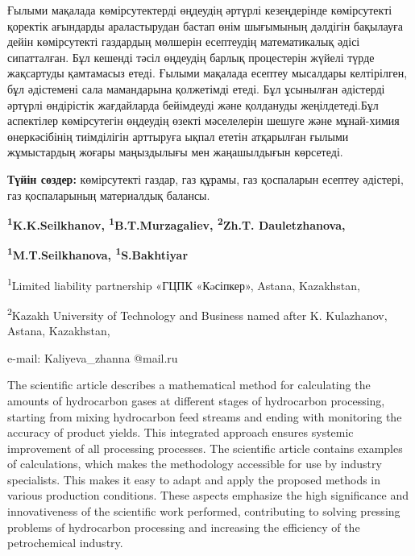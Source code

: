 Ғылыми мақалада көмірсутектерді өңдеудің әртүрлі кезеңдерінде
көмірсутекті қоректік ағындарды араластырудан бастап өнім шығымының
дәлдігін бақылауға дейін көмірсутекті газдардың мөлшерін есептеудің
математикалық әдісі сипатталған. Бұл кешенді тәсіл өңдеудің барлық
процестерін жүйелі түрде жақсартуды қамтамасыз етеді. Ғылыми мақалада
есептеу мысалдары келтірілген, бұл әдістемені сала мамандарына
қолжетімді етеді. Бұл ұсынылған әдістерді әртүрлі өндірістік жағдайларда
бейімдеуді және қолдануды жеңілдетеді.Бұл аспектілер көмірсутегін
өңдеудің өзекті мәселелерін шешуге және мұнай-химия өнеркәсібінің
тиімділігін арттыруға ықпал ететін атқарылған ғылыми жұмыстардың жоғары
маңыздылығы мен жаңашылдығын көрсетеді.

{\bfseries Түйін сөздер:} көмірсутекті газдар, газ құрамы, газ қоспаларын
есептеу әдістері, газ қоспаларының материалдық балансы.


\begin{center}
{\bfseries \textsuperscript{1}K.K.Seilkhanov,
\textsuperscript{1}B.T.Murzagaliev, \textsuperscript{2}Zh.T.
Dauletzhanova\envelope,}

{\bfseries \textsuperscript{1}M.T.Seilkhanova,
\textsuperscript{1}S.Bakhtiyar}

\textsuperscript{1}Limited liability partnership «ГЦПК «Кəсіпкер»,
Astana, Kazakhstan,

\textsuperscript{2}Kazakh University of Technology and Business named
after K. Kulazhanov, Astana, Kazakhstan,

e-mail: Kaliyeva\_zhanna @mail.ru
\end{center}

The scientific article describes a mathematical method for calculating
the amounts of hydrocarbon gases at different stages of hydrocarbon
processing, starting from mixing hydrocarbon feed streams and ending
with monitoring the accuracy of product yields. This integrated approach
ensures systemic improvement of all processing processes. The scientific
article contains examples of calculations, which makes the methodology
accessible for use by industry specialists. This makes it easy to adapt
and apply the proposed methods in various production conditions. These
aspects emphasize the high significance and innovativeness of the
scientific work performed, contributing to solving pressing problems of
hydrocarbon processing and increasing the efficiency of the
petrochemical industry.

